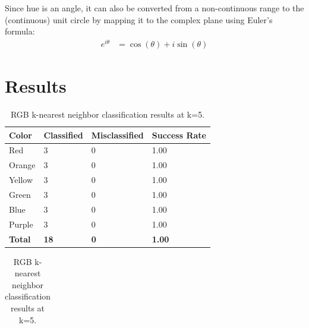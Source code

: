 \documentclass[twoside]{IEEEtran}
\begin{document}
Since hue is an angle, it can also be converted from a non-continuous range to the (continuous)
unit circle by mapping it to the complex plane using Euler's formula:
\begin{align}
    e^{i\theta} & = \cos\left(\theta\right) + i \sin\left(\theta\right)
\end{align}

\section{Results}

\begin{table}[!b]
    \centering

    \begin{minipage}{\columnwidth}
        \centering
        \caption{RGB k-nearest neighbor classification results at k=3.}%
        \label{rgb_knn_3}
        \begin{tabular}{ l l l l }
            \toprule
            \bfseries Color & \bfseries Classified & \bfseries Misclassified & \bfseries Success Rate \\
            \midrule
            Red             & 3                    & 0                       & 1.00                   \\
            Orange          & 3                    & 0                       & 1.00                   \\
            Yellow          & 3                    & 0                       & 1.00                   \\
            Green           & 3                    & 0                       & 1.00                   \\
            Blue            & 3                    & 0                       & 1.00                   \\
            Purple          & 3                    & 0                       & 1.00                   \\
            \midrule
            \bfseries Total & \bfseries 18         & \bfseries 0             & \bfseries 1.00         \\
            \bottomrule
        \end{tabular}
    \end{minipage}%
    \begin{minipage}{\columnwidth}
        \centering
        \caption{RGB k-nearest neighbor classification results at k=5.}%
        \label{rgb_knn_5}
        \begin{tabular}{ l l l l }

\end{tabular}
\end{minipage}
\end{table}
\end{document}
